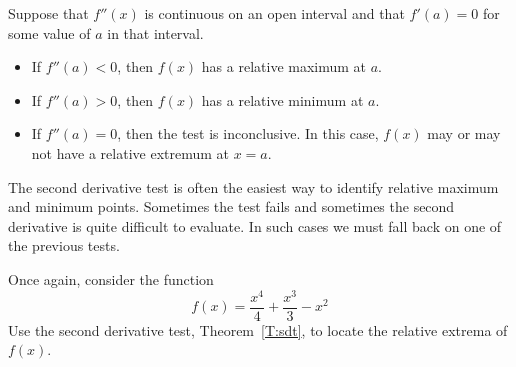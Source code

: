 \begin{theorem}\label{T:sdt}
Suppose that $f''(x)$ is continuous on an open interval and that
$f'(a)=0$ for some value of $a$ in that interval.
\begin{itemize}
\item If $f''(a) <0$, then $f(x)$ has a relative maximum at $a$.
\item If $f''(a) >0$, then $f(x)$ has a relative minimum at $a$.
\item If $f''(a) =0$, then the test is inconclusive. In this case,
  $f(x)$ may or may not have a relative extremum at $x=a$.
\end{itemize}
\end{theorem}


The second derivative test is often the easiest way to identify relative
maximum and minimum points. Sometimes the test fails and sometimes
the second derivative is quite difficult to evaluate. In such cases we
must fall back on one of the previous tests. \cite{mooc}

\clearpage
\begin{example}
Once again, consider the function 
$$
f(x) = \frac{x^4}{4}+\frac{x^3}{3}-x^2
$$
Use the second derivative test, Theorem~\ref{T:sdt}, to locate the
relative extrema of $f(x)$.  \cite{mooc}
\end{example}

